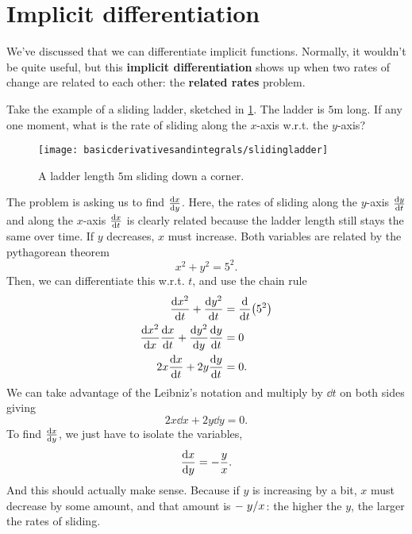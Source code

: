 \section{Implicit differentiation}

We've discussed that we can differentiate implicit functions. Normally, it wouldn't be quite useful, but this \textbf{implicit differentiation} shows up when two rates of change are related to each other: the \textbf{related rates} problem.

Take the example of a sliding ladder, sketched in \cref{fig:slidingladder}. The ladder is $5\unit{\meter}$ long. If any one moment, what is the rate of sliding along the $x$-axis w.r.t. the $y$-axis?

\begin{figure}
    \centering
    \texttt{[image: basicderivativesandintegrals/slidingladder]}
    \caption{A ladder length $5\unit{\meter}$ sliding down a corner.}
    \label{fig:slidingladder}
\end{figure}

The problem is asking us to find $\dv{x}{y}$. Here, the rates of sliding along the $y$-axis $\dv{y}{t}$ and along the $x$-axis $\dv{x}{t}$ is clearly related because the ladder length still stays the same over time. If $y$ decreases, $x$ must increase. Both variables are related by the pythagorean theorem
\begin{equation}
    x^2 + y^2 = 5^2.
\end{equation}
Then, we can differentiate this w.r.t. $t$, and use the chain rule
\begin{align*}
    \dv{x^2}{t} + \dv{y^2}{t} &= \dv{t}(5^2) \\
    \dv{x^2}{x}\dv{x}{t} + \dv{y^2}{y}\dv{y}{t} &= 0 \\
    2x\dv{x}{t} + 2y\dv{y}{t} &= 0.
\end{align*}
We can take advantage of the Leibniz's notation and multiply by $\dd{t}$ on both sides giving
\begin{equation*}
    2x\dd{x} + 2y\dd{y} = 0.
\end{equation*}
To find $\dv{x}{y}$, we just have to isolate the variables,
\begin{align*}
    \dv{x}{y} = -\frac{y}{x}.
\end{align*}
And this should actually make sense. Because if $y$ is increasing by a bit, $x$ must decrease by some amount, and that amount is $-\flatfrac{y}{x}$: the higher the $y$, the larger the rates of sliding.

